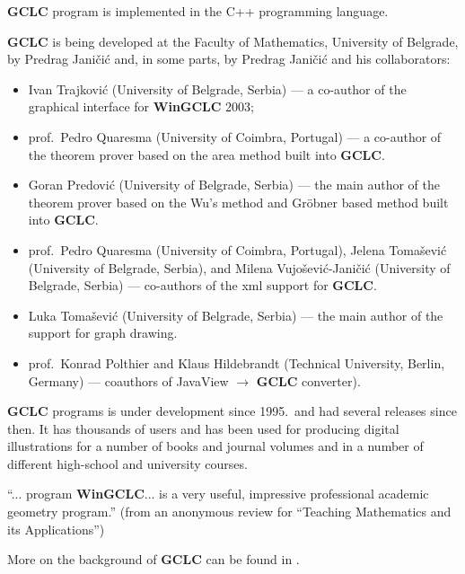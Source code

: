 \documentclass[a4paper]{book}
\newcommand{\gclc}{{\bfseries GCLC}\xspace}
\newcommand{\wingclc}{{\bfseries WinGCLC}\xspace}
\begin{document}
\begin{description}
\gclc program is implemented in the C++ programming language.

\item[Author:]
\gclc is being developed at the Faculty of Mathematics,
University of Belgrade, by Predrag Jani\v{c}i\'c and, in some
parts, by Predrag Jani\v{c}i\'c and his collaborators:
\begin{itemize}
\item Ivan Trajkovi\'c (University of Belgrade, Serbia)
--- a co-author of the graphical interface for \wingclc 2003;
\item prof.~Pedro Quaresma (University of Coimbra, Portugal) ---
a co-author of the theorem prover based on the area method built into \gclc.

\item Goran Predovi\'c (University of Belgrade, Serbia) --- the main 
author of the theorem prover based on the Wu's method and Gr\"obner 
based method built into \gclc.

\item prof.~Pedro Quaresma (University of Coimbra, Portugal),
Jelena To\-ma\-\v{s}e\-vi\'c (University of Belgrade, Serbia), and
Milena Vujo\v{s}evi\'c-Jani\v{c}i\'c (University of Belgrade, Serbia)
--- co-authors of the {\sc xml} support for \gclc.

\item Luka Toma\v{s}evi\'c (University of Belgrade, Serbia) --- the
main author of the support for graph drawing.

\item prof.~Konrad Polthier and Klaus Hildebrandt (Technical University,
Berlin, Germany) --- coauthors of JavaView $\rightarrow$ \gclc converter).
\end{itemize}

\item[Version history:]
\gclc programs is under development since 1995.~and had several releases 
since then. It has thousands of users and has been used for producing 
digital illustrations for a number of books and journal volumes and in 
a number of different high-school and university courses.

\item[What others said about \gclc/\wingclc:]
``... program \wingclc ... is a very useful, impressive professional
academic geometry program.'' (from an anonymous review for ``Teaching
Mathematics and its Applications'')

\item[References:]
More on the background of \gclc can be found in
\cite{gclc,wingclc, constructions-teamat,gclc-mkm,gclc-ijcar,gclc-jar}.
\end{description}
\end{document}
